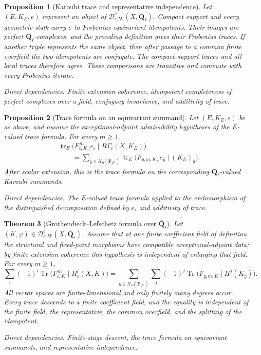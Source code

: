 \documentclass[10pt]{article}
\newtheorem{theorem}{Theorem}[section]
\newtheorem{proposition}[theorem]{Proposition}
\theoremstyle{definition}
\newcommand{\Qlb}{\overline{\mathbf Q}_\ell}
\newcommand{\DbcW}{\mathcal D^b_{c,\mathrm W}}
\newcommand{\Tr}{\operatorname{Tr}}
\newcommand{\RGammac}{R\Gamma_c}
\newcommand{\depends}[1]{\par\smallskip\noindent\textit{Direct dependencies.} #1\par}
\begin{document}
\begin{proposition}[Karoubi trace and representative independence]
Let \((E,K_E,e)\) represent an object of \(\DbcW(X,\Qlb)\).  Compact support
and every geometric stalk carry \(e\) to Frobenius-equivariant idempotents.
Their images are perfect \(\Qlb\)-complexes, and the preceding definition
gives their Frobenius traces.  If another triple represents the same object,
then after passage to a common finite overfield the two idempotents are
conjugate.  The compact-support traces and all local traces therefore agree.
These comparisons are transitive and commute with every Frobenius iterate.
\depends{Finite-extension coherence, idempotent completeness of perfect
complexes over a field, conjugacy invariance, and additivity of trace.}
\end{proposition}

\begin{proposition}[Trace formula on an equivariant summand]
Let \((E,K_E,e)\) be as above, and assume the exceptional-adjoint
admissibility hypotheses of the \(E\)-valued trace formula.  For every
\(m\geq1\),
\[
\begin{aligned}
&\operatorname{tr}_E
\bigl(F_{c,K_E}^{\,m}e_c\mid\RGammac(X,K_E)\bigr)\\
&\qquad =
\sum_{y\in X_0(\mathbf F_{q^m})}
\operatorname{tr}_E
\bigl(F_{y,m,K_E}e_{\bar y}\mid(K_E)_{\bar y}\bigr).
\end{aligned}
\]
After scalar extension, this is the trace formula on the corresponding
\(\Qlb\)-valued Karoubi summands.
\depends{The \(E\)-valued trace formula applied to the endomorphism of the
distinguished decomposition defined by \(e\), and additivity of trace.}
\end{proposition}

\begin{theorem}[Grothendieck--Lefschetz formula over \(\Qlb\)]
Let \((K,\varphi)\in\DbcW(X,\Qlb)\).  Assume that at one finite coefficient
field of definition the structural and fixed-point morphisms have compatible
exceptional-adjoint data; by finite-extension coherence this hypothesis is
independent of enlarging that field.  For every \(m\geq1\),
\[
 \boxed{
 \sum_i(-1)^i\Tr
 \bigl(F_{c,K}^{\,m}\mid H_c^i(X,K)\bigr)
 =
 \sum_{y\in X_0(\mathbf F_{q^m})}
 \sum_j(-1)^j\Tr
 \bigl(F_{y,m,K}\mid H^j(K_{\bar y})\bigr).}
\]
All vector spaces are finite-dimensional and only finitely many degrees
occur.  Every trace descends to a finite coefficient field, and the equality
is independent of the finite field, the representative, the common
overfield, and the splitting of the idempotent.
\depends{Finite-stage descent, the trace formula on equivariant summands,
and representative independence.}
\end{theorem}
\end{document}
